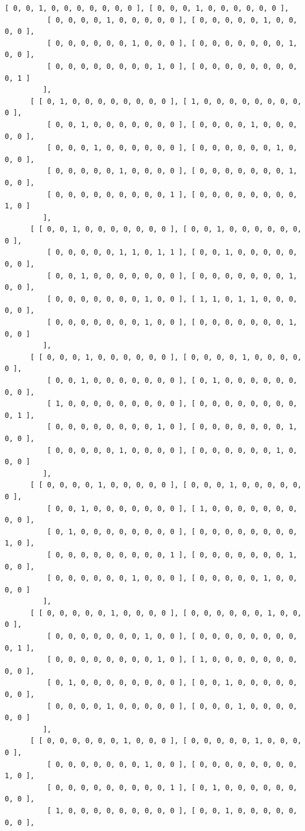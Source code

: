 \documentclass[a4paper, 10pt]{book}
\theoremstyle{definition}
\numberwithin{equation}{chapter}
\begin{document}
\begin{appendices}
\begin{enumerate}
\begin{lstlisting}[numbers=none]
          [ 0, 0, 1, 0, 0, 0, 0, 0, 0, 0 ], [ 0, 0, 0, 1, 0, 0, 0, 0, 0, 0 ],
          [ 0, 0, 0, 0, 1, 0, 0, 0, 0, 0 ], [ 0, 0, 0, 0, 0, 1, 0, 0, 0, 0 ],
          [ 0, 0, 0, 0, 0, 0, 1, 0, 0, 0 ], [ 0, 0, 0, 0, 0, 0, 0, 1, 0, 0 ],
          [ 0, 0, 0, 0, 0, 0, 0, 0, 1, 0 ], [ 0, 0, 0, 0, 0, 0, 0, 0, 0, 1 ] 
         ], 
      [ [ 0, 1, 0, 0, 0, 0, 0, 0, 0, 0 ], [ 1, 0, 0, 0, 0, 0, 0, 0, 0, 0 ], 
          [ 0, 0, 1, 0, 0, 0, 0, 0, 0, 0 ], [ 0, 0, 0, 0, 1, 0, 0, 0, 0, 0 ],
          [ 0, 0, 0, 1, 0, 0, 0, 0, 0, 0 ], [ 0, 0, 0, 0, 0, 0, 1, 0, 0, 0 ],
          [ 0, 0, 0, 0, 0, 1, 0, 0, 0, 0 ], [ 0, 0, 0, 0, 0, 0, 0, 1, 0, 0 ],
          [ 0, 0, 0, 0, 0, 0, 0, 0, 0, 1 ], [ 0, 0, 0, 0, 0, 0, 0, 0, 1, 0 ] 
         ], 
      [ [ 0, 0, 1, 0, 0, 0, 0, 0, 0, 0 ], [ 0, 0, 1, 0, 0, 0, 0, 0, 0, 0 ], 
          [ 0, 0, 0, 0, 0, 1, 1, 0, 1, 1 ], [ 0, 0, 1, 0, 0, 0, 0, 0, 0, 0 ],
          [ 0, 0, 1, 0, 0, 0, 0, 0, 0, 0 ], [ 0, 0, 0, 0, 0, 0, 0, 1, 0, 0 ],
          [ 0, 0, 0, 0, 0, 0, 0, 1, 0, 0 ], [ 1, 1, 0, 1, 1, 0, 0, 0, 0, 0 ],
          [ 0, 0, 0, 0, 0, 0, 0, 1, 0, 0 ], [ 0, 0, 0, 0, 0, 0, 0, 1, 0, 0 ] 
         ], 
      [ [ 0, 0, 0, 1, 0, 0, 0, 0, 0, 0 ], [ 0, 0, 0, 0, 1, 0, 0, 0, 0, 0 ], 
          [ 0, 0, 1, 0, 0, 0, 0, 0, 0, 0 ], [ 0, 1, 0, 0, 0, 0, 0, 0, 0, 0 ],
          [ 1, 0, 0, 0, 0, 0, 0, 0, 0, 0 ], [ 0, 0, 0, 0, 0, 0, 0, 0, 0, 1 ],
          [ 0, 0, 0, 0, 0, 0, 0, 0, 1, 0 ], [ 0, 0, 0, 0, 0, 0, 0, 1, 0, 0 ],
          [ 0, 0, 0, 0, 0, 1, 0, 0, 0, 0 ], [ 0, 0, 0, 0, 0, 0, 1, 0, 0, 0 ] 
         ], 
      [ [ 0, 0, 0, 0, 1, 0, 0, 0, 0, 0 ], [ 0, 0, 0, 1, 0, 0, 0, 0, 0, 0 ], 
          [ 0, 0, 1, 0, 0, 0, 0, 0, 0, 0 ], [ 1, 0, 0, 0, 0, 0, 0, 0, 0, 0 ],
          [ 0, 1, 0, 0, 0, 0, 0, 0, 0, 0 ], [ 0, 0, 0, 0, 0, 0, 0, 0, 1, 0 ],
          [ 0, 0, 0, 0, 0, 0, 0, 0, 0, 1 ], [ 0, 0, 0, 0, 0, 0, 0, 1, 0, 0 ],
          [ 0, 0, 0, 0, 0, 0, 1, 0, 0, 0 ], [ 0, 0, 0, 0, 0, 1, 0, 0, 0, 0 ] 
         ], 
      [ [ 0, 0, 0, 0, 0, 1, 0, 0, 0, 0 ], [ 0, 0, 0, 0, 0, 0, 1, 0, 0, 0 ], 
          [ 0, 0, 0, 0, 0, 0, 0, 1, 0, 0 ], [ 0, 0, 0, 0, 0, 0, 0, 0, 0, 1 ],
          [ 0, 0, 0, 0, 0, 0, 0, 0, 1, 0 ], [ 1, 0, 0, 0, 0, 0, 0, 0, 0, 0 ],
          [ 0, 1, 0, 0, 0, 0, 0, 0, 0, 0 ], [ 0, 0, 1, 0, 0, 0, 0, 0, 0, 0 ],
          [ 0, 0, 0, 0, 1, 0, 0, 0, 0, 0 ], [ 0, 0, 0, 1, 0, 0, 0, 0, 0, 0 ] 
         ], 
      [ [ 0, 0, 0, 0, 0, 0, 1, 0, 0, 0 ], [ 0, 0, 0, 0, 0, 1, 0, 0, 0, 0 ], 
          [ 0, 0, 0, 0, 0, 0, 0, 1, 0, 0 ], [ 0, 0, 0, 0, 0, 0, 0, 0, 1, 0 ],
          [ 0, 0, 0, 0, 0, 0, 0, 0, 0, 1 ], [ 0, 1, 0, 0, 0, 0, 0, 0, 0, 0 ],
          [ 1, 0, 0, 0, 0, 0, 0, 0, 0, 0 ], [ 0, 0, 1, 0, 0, 0, 0, 0, 0, 0 ],

\end{lstlisting}
\end{enumerate}
\end{appendices}
\end{document}
